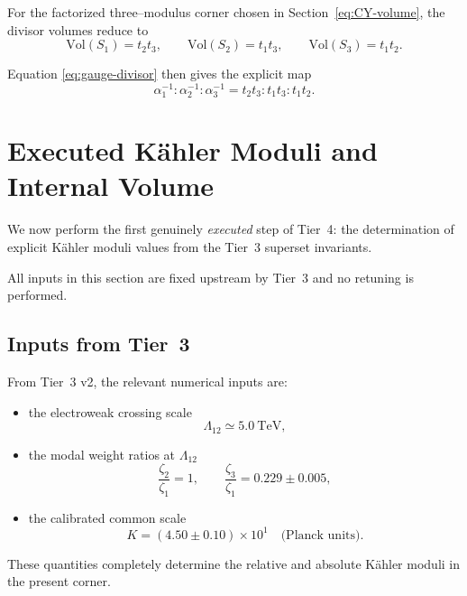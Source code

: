 \documentclass[11pt]{article}
\begin{document}
For the factorized three--modulus corner chosen in
Section~\ref{eq:CY-volume}, the divisor volumes reduce to
\begin{equation}
\mathrm{Vol}(S_1)=t_2 t_3,\qquad
\mathrm{Vol}(S_2)=t_1 t_3,\qquad
\mathrm{Vol}(S_3)=t_1 t_2.
\label{eq:divisor-volumes}
\end{equation}

Equation \eqref{eq:gauge-divisor} then gives the explicit map
\begin{equation}
\alpha_1^{-1}:\alpha_2^{-1}:\alpha_3^{-1}
=
t_2 t_3 : t_1 t_3 : t_1 t_2 .
\label{eq:alpha-ti-map}
\end{equation}

\section{Executed K\"ahler Moduli and Internal Volume}
\label{sec:kahler-executed}

We now perform the first genuinely \emph{executed} step of Tier~4:
the determination of explicit K\"ahler moduli values from the
Tier~3 superset invariants.

All inputs in this section are fixed upstream by Tier~3 and no
retuning is performed.

\subsection{Inputs from Tier~3}

From Tier~3 v2, the relevant numerical inputs are:
\begin{itemize}
  \item the electroweak crossing scale
        \[
        \Lambda_{12} \simeq 5.0~\mathrm{TeV},
        \]
  \item the modal weight ratios at $\Lambda_{12}$
        \[
        \frac{\zeta_2}{\zeta_1} = 1,
        \qquad
        \frac{\zeta_3}{\zeta_1} = 0.229 \pm 0.005,
        \]
  \item the calibrated common scale
        \[
        K = (4.50 \pm 0.10)\times 10^{1}
        \quad \text{(Planck units)}.
        \]
\end{itemize}

These quantities completely determine the relative and absolute
K\"ahler moduli in the present corner.

\end{document}
